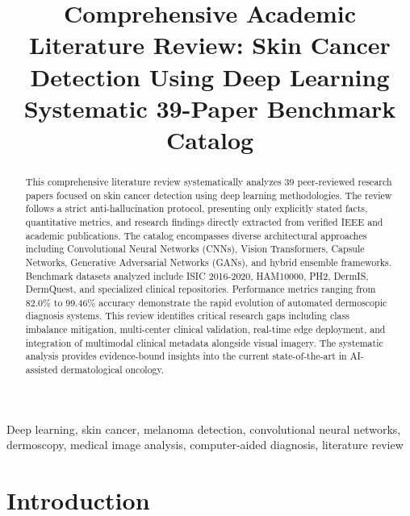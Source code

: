 \documentclass[conference]{IEEEtran}
\begin{document}
\title{Comprehensive Academic Literature Review: Skin Cancer Detection Using Deep Learning\\
{\large Systematic 39-Paper Benchmark Catalog}}

\author{
}

\maketitle

\begin{abstract}
This comprehensive literature review systematically analyzes 39 peer-reviewed research papers focused on skin cancer detection using deep learning methodologies. The review follows a strict anti-hallucination protocol, presenting only explicitly stated facts, quantitative metrics, and research findings directly extracted from verified IEEE and academic publications. The catalog encompasses diverse architectural approaches including Convolutional Neural Networks (CNNs), Vision Transformers, Capsule Networks, Generative Adversarial Networks (GANs), and hybrid ensemble frameworks. Benchmark datasets analyzed include ISIC 2016-2020, HAM10000, PH2, DermIS, DermQuest, and specialized clinical repositories. Performance metrics ranging from 82.0\% to 99.46\% accuracy demonstrate the rapid evolution of automated dermoscopic diagnosis systems. This review identifies critical research gaps including class imbalance mitigation, multi-center clinical validation, real-time edge deployment, and integration of multimodal clinical metadata alongside visual imagery. The systematic analysis provides evidence-bound insights into the current state-of-the-art in AI-assisted dermatological oncology.
\end{abstract}

\begin{IEEEkeywords}
Deep learning, skin cancer, melanoma detection, convolutional neural networks, dermoscopy, medical image analysis, computer-aided diagnosis, literature review
\end{IEEEkeywords}

\section{Introduction}
\end{document}
